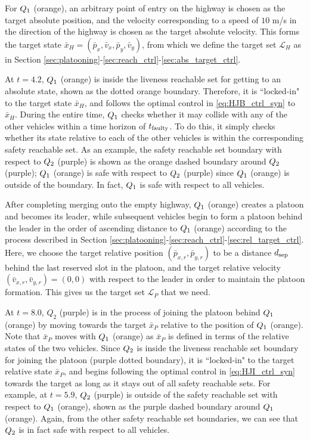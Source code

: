 For $Q_{1}$ (orange), an arbitrary point of entry on the highway is chosen as the target absolute position, and the velocity corresponding to a speed of $10$ m/s in the direction of the highway is chosen as the target absolute velocity. This forms the target state $\bar{x}_H=(\bar{p}_x, \bar{v}_x, \bar{p}_y, \bar{v}_y)$, from which we define the target set $\mathcal{L}_H$ as in Section \ref{sec:platooning}-\ref{sec:reach_ctrl}-\ref{sec:abs_target_ctrl}.

At $t=4.2$, $Q_{1}$ (orange) is inside the liveness reachable set for getting to an absolute state, shown as the dotted orange boundary. Therefore, it is ``locked-in" to the target state $\bar{x}_H$, and follows the optimal control in \eqref{eq:HJB_ctrl_syn} to $\bar{x}_H$. During the entire time, $Q_{1}$ checks whether it may collide with any of the other vehicles within a time horizon of $t_\text{faulty}$. To do this, it simply checks whether its state relative to each of the other vehicles is within the corresponding safety reachable set. As an example, the safety reachable set boundary with respect to $Q_{2}$ (purple) is shown as the orange dashed boundary around $Q_{2}$ (purple); $Q_{1}$ (orange) is safe with respect to $Q_{2}$ (purple) since $Q_{1}$ (orange) is outside of the boundary. In fact, $Q_{1}$ is safe with respect to all vehicles.

After completing merging onto the empty highway, $Q_{1}$ (orange) creates a platoon and becomes its leader, while subsequent vehicles begin to form a platoon behind the leader in the order of ascending distance to $Q_{1}$ (orange) according to the process described in Section \ref{sec:platooning}-\ref{sec:reach_ctrl}-\ref{sec:rel_target_ctrl}. Here, we choose the target relative position $(\bar{p}_{x,r}, \bar{p}_{y,r})$ to be a distance $d_\text{sep}$ behind the last reserved slot in the platoon, and the target relative velocity $(\bar{v}_{x,r}, \bar{v}_{y,r}) = (0,0)$ with respect to the leader in order to maintain the platoon formation. This gives us the target set $\mathcal{L}_P$ that we need.

At $t=8.0$, $Q_2$ (purple) is in the process of joining the platoon behind $Q_{1}$ (orange) by moving towards the target $\bar{x}_P$ relative to the position of $Q_{1}$ (orange). Note that $\bar{x}_P$ moves with $Q_{1}$ (orange) as $\bar{x}_P$ is defined in terms of the relative states of the two vehicles. Since $Q_{2}$ is inside the liveness reachable set boundary for joining the platoon (purple dotted boundary), it is ``locked-in" to the target relative state $\bar{x}_P$, and begins following the optimal control in \eqref{eq:HJI_ctrl_syn} towards the target as long as it stays out of all safety reachable sets. For example, at $t=5.9$, $Q_{2}$ (purple) is outside of the safety reachable set with respect to $Q_{1}$ (orange), shown as the purple dashed boundary around $Q_{1}$ (orange). Again, from the other safety reachable set boundaries, we can see that $Q_{2}$ is in fact safe with respect to all vehicles.

